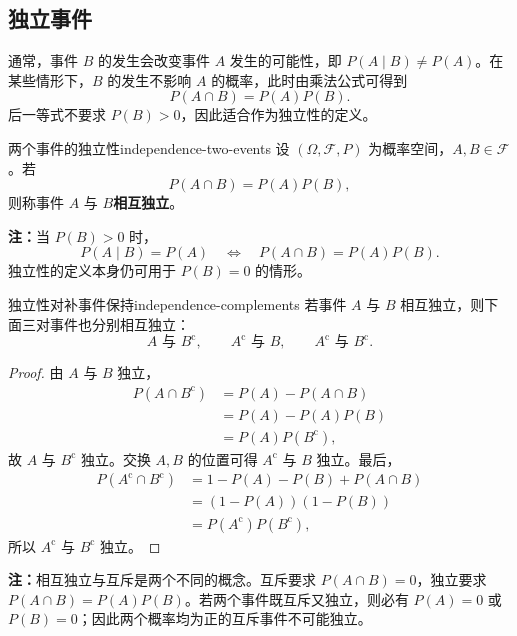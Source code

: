 \subsection*{独立事件}

通常，事件 $B$ 的发生会改变事件 $A$ 发生的可能性，即 $P(A\mid B)\ne P(A)$。在某些情形下，$B$ 的发生不影响 $A$ 的概率，此时由乘法公式可得到
\[
P(A\cap B)=P(A)P(B).
\]
后一等式不要求 $P(B)>0$，因此适合作为独立性的定义。

\begin{mydefinition}{两个事件的独立性}{independence-two-events}
设 $(\Omega,\mathscr{F},P)$ 为概率空间，$A,B\in\mathscr{F}$。若
\[
P(A\cap B)=P(A)P(B),
\]
则称事件 $A$ 与 $B$\textbf{相互独立}。
\end{mydefinition}

\textbf{注：}\quad 当 $P(B)>0$ 时，
\[
P(A\mid B)=P(A)
\quad\Longleftrightarrow\quad
P(A\cap B)=P(A)P(B).
\]
独立性的定义本身仍可用于 $P(B)=0$ 的情形。

\begin{proposition}{独立性对补事件保持}{independence-complements}
若事件 $A$ 与 $B$ 相互独立，则下面三对事件也分别相互独立：
\[
A\text{ 与 }B^{\mathrm c},
\qquad
A^{\mathrm c}\text{ 与 }B,
\qquad
A^{\mathrm c}\text{ 与 }B^{\mathrm c}.
\]
\end{proposition}

\begin{proof}
由 $A$ 与 $B$ 独立，
\[
\begin{aligned}
P(A\cap B^{\mathrm c})
&=P(A)-P(A\cap B)\\
&=P(A)-P(A)P(B)\\
&=P(A)P(B^{\mathrm c}),
\end{aligned}
\]
故 $A$ 与 $B^{\mathrm c}$ 独立。交换 $A,B$ 的位置可得 $A^{\mathrm c}$ 与 $B$ 独立。最后，
\[
\begin{aligned}
P(A^{\mathrm c}\cap B^{\mathrm c})
&=1-P(A)-P(B)+P(A\cap B)\\
&=(1-P(A))(1-P(B))\\
&=P(A^{\mathrm c})P(B^{\mathrm c}),
\end{aligned}
\]
所以 $A^{\mathrm c}$ 与 $B^{\mathrm c}$ 独立。
\end{proof}

\textbf{注：}\quad 相互独立与互斥是两个不同的概念。互斥要求 $P(A\cap B)=0$，独立要求 $P(A\cap B)=P(A)P(B)$。若两个事件既互斥又独立，则必有 $P(A)=0$ 或 $P(B)=0$；因此两个概率均为正的互斥事件不可能独立。

